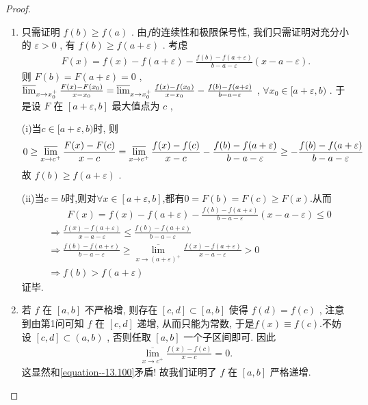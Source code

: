 \documentclass[../../main.tex]{subfiles}
\begin{document}
\begin{proof}
\begin{enumerate}
\item 只需证明 \(f(b) \geq f(a)\) . 由$f$的连续性和极限保号性, 我们只需证明对充分小的 \(\varepsilon > 0\) , 有 \(f(b) \geq f(a + \varepsilon)\) . 考虑
\begin{align*}
F(x) = f(x) - f(a + \varepsilon) - \frac{f(b) - f(a + \varepsilon)}{b - a - \varepsilon}(x - a - \varepsilon).
\end{align*}
则
\(F(b) = F(a + \varepsilon) = 0\) , \(\varlimsup_{x \to x_0^+} \frac{F(x) - F(x_0)}{x - x_0} = \varlimsup_{x \to x_0^+} \frac{f(x) - f(x_0)}{x - x_0} - \frac{f(b) - f(a + \varepsilon)}{b - a - \varepsilon}\) , \(\forall x_0 \in [a + \varepsilon, b)\) .
于是设 \(F\) 在 \([a + \varepsilon, b]\) 最大值点为 \(c \) ,

(i)当$c\in [a + \varepsilon, b)$时, 则
\begin{align*}
0 \geq \varlimsup_{x \to c^+} \frac{F(x) - F(c)}{x - c} = \varlimsup_{x \to c^+} \frac{f(x) - f(c)}{x - c} - \frac{f(b) - f(a + \varepsilon)}{b - a - \varepsilon} \geq - \frac{f(b) - f(a + \varepsilon)}{b - a - \varepsilon}
\end{align*}
故 \(f(b) \geq f(a + \varepsilon)\) . 

(ii)当$c=b$时,则对$\forall x\in [a+\varepsilon,b]$,都有$0=F(b)=F(c)\geqslant F(x)$.从而
\begin{align*}
&\quad \quad F(x)=f(x)-f(a+\varepsilon )-\frac{f(b)-f(a+\varepsilon )}{b-a-\varepsilon}(x-a-\varepsilon )\leqslant 0
\\
&\Rightarrow \frac{f(x)-f(a+\varepsilon )}{x-a-\varepsilon}\leqslant \frac{f(b)-f(a+\varepsilon )}{b-a-\varepsilon}
\\
&\Rightarrow \frac{f(b)-f(a+\varepsilon )}{b-a-\varepsilon}\geqslant \underset{x\rightarrow \left( a+\varepsilon \right) ^+}{\overline{\lim }}\frac{f(x)-f(a+\varepsilon )}{x-a-\varepsilon}>0
\\
&\Rightarrow f(b)>f(a+\varepsilon )
\end{align*}
证毕.

\item 若 \(f\) 在 \([a, b]\) 不严格增, 则存在 \([c, d] \subset [a, b]\) 使得 \(f(d) = f(c)\) , 注意到由第1问可知 \(f\) 在 \([c, d]\) 递增, 从而只能为常数, 于是$f(x)\equiv f(c)$.不妨设 \([c, d] \subset (a, b)\) , 否则任取 \([a, b]\) 一个子区间即可. 因此
\begin{align*}
\underset{x\rightarrow c^+}{\overline{\lim }}\frac{f(x)-f(c)}{x-c}=0.
\end{align*}
这显然和\eqref{equation--13.100}矛盾! 故我们证明了 \(f\) 在 \([a, b]\) 严格递增.


\end{enumerate}
\end{proof}
\end{document}
